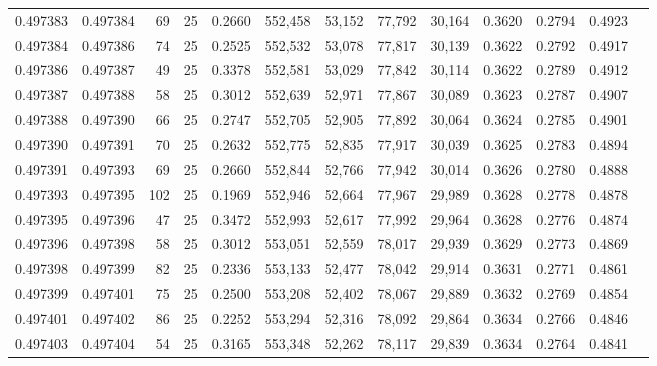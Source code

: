 \begin{tabular}{rrrrrrrrrrrrr}
0.497383 & 0.497384 &    69 &  25 &                                     0.2660 & 552,458 &  53,152 &  77,792 &  30,164 & 0.3620 & 0.2794 & 0.4923 \\
0.497384 & 0.497386 &    74 &  25 &                                     0.2525 & 552,532 &  53,078 &  77,817 &  30,139 & 0.3622 & 0.2792 & 0.4917 \\
0.497386 & 0.497387 &    49 &  25 &                                     0.3378 & 552,581 &  53,029 &  77,842 &  30,114 & 0.3622 & 0.2789 & 0.4912 \\
0.497387 & 0.497388 &    58 &  25 &                                     0.3012 & 552,639 &  52,971 &  77,867 &  30,089 & 0.3623 & 0.2787 & 0.4907 \\
0.497388 & 0.497390 &    66 &  25 &                                     0.2747 & 552,705 &  52,905 &  77,892 &  30,064 & 0.3624 & 0.2785 & 0.4901 \\
0.497390 & 0.497391 &    70 &  25 &                                     0.2632 & 552,775 &  52,835 &  77,917 &  30,039 & 0.3625 & 0.2783 & 0.4894 \\
0.497391 & 0.497393 &    69 &  25 &                                     0.2660 & 552,844 &  52,766 &  77,942 &  30,014 & 0.3626 & 0.2780 & 0.4888 \\
0.497393 & 0.497395 &   102 &  25 &                                     0.1969 & 552,946 &  52,664 &  77,967 &  29,989 & 0.3628 & 0.2778 & 0.4878 \\
0.497395 & 0.497396 &    47 &  25 &                                     0.3472 & 552,993 &  52,617 &  77,992 &  29,964 & 0.3628 & 0.2776 & 0.4874 \\
0.497396 & 0.497398 &    58 &  25 &                                     0.3012 & 553,051 &  52,559 &  78,017 &  29,939 & 0.3629 & 0.2773 & 0.4869 \\
0.497398 & 0.497399 &    82 &  25 &                                     0.2336 & 553,133 &  52,477 &  78,042 &  29,914 & 0.3631 & 0.2771 & 0.4861 \\
0.497399 & 0.497401 &    75 &  25 &                                     0.2500 & 553,208 &  52,402 &  78,067 &  29,889 & 0.3632 & 0.2769 & 0.4854 \\
0.497401 & 0.497402 &    86 &  25 &                                     0.2252 & 553,294 &  52,316 &  78,092 &  29,864 & 0.3634 & 0.2766 & 0.4846 \\
0.497403 & 0.497404 &    54 &  25 &                                     0.3165 & 553,348 &  52,262 &  78,117 &  29,839 & 0.3634 & 0.2764 & 0.4841 \\

\end{tabular}
